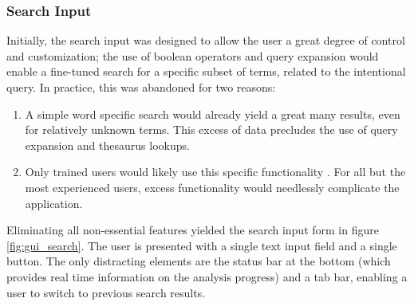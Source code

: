\subsubsection{Search Input}
Initially, the search input was designed to allow the user a great degree of control and customization; the use of boolean operators and query expansion would enable a fine-tuned search for a specific subset of terms, related to the intentional query. In practice, this was abandoned for two reasons:

\begin{enumerate}
	\item A simple word specific search would already yield a great many results, even for relatively  unknown terms. This excess of data precludes the use of query expansion and thesaurus lookups.
	\item Only trained users would likely use this specific functionality \cite{jansen2000real}. For all but the most experienced users, excess functionality would needlessly complicate the application.
\end{enumerate}

Eliminating all non-essential features yielded the search input form in figure \ref{fig:gui_search}. The user is presented with a single text input field and a single button. The only distracting elements are the status bar at the bottom (which provides real time information on the analysis progress) and a tab bar, enabling a user to switch to previous search results.

